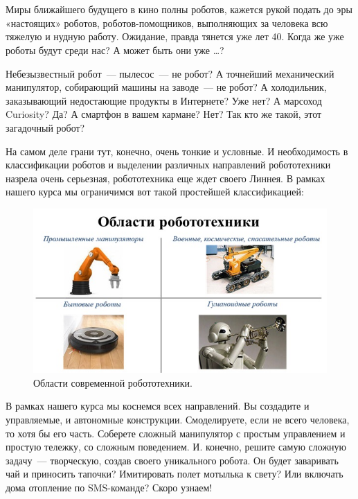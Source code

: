 {\hypertarget{lesson1x4}{}}\\\\

Миры ближайшего будущего в кино полны роботов, кажется рукой подать до  эры «настоящих» роботов, роботов-помощников, выполняющих за человека всю тяжелую и нудную работу. Ожидание, правда тянется уже лет 40. Когда же уже роботы будут среди нас? А может быть они уже \dots?

Небезызвестный робот~--- пылесос~--- не робот? А точнейший механический манипулятор, собирающий  машины на заводе~--- не робот? А холодильник, заказывающий недостающие продукты в Интернете? Уже нет?  А  марсоход  Curiosity? Да? А смартфон в вашем кармане? Нет?  Так кто же такой, этот загадочный робот?

На самом деле грани тут, конечно, очень тонкие и условные. И необходимость в классификации роботов и выделении различных направлений робототехники назрела очень серьезная, робототехника еще ждет своего Линнея. В рамках нашего курса мы ограничимся вот такой простейшей классификацией:
\clearpage
\begin{figure}[h!]
	\begin{center}
		\includegraphics[width=1\linewidth]{chapters/chapter1/images/10}
		\caption{Области современной робототехники.}
		\label{ris:image1x10}
	\end{center}
\end{figure}		

В рамках нашего курса мы коснемся всех направлений. Вы создадите и управляемые, и автономные конструкции. Смоделируете, если не всего человека, то хотя бы его часть. Соберете сложный манипулятор с простым управлением и простую тележку, со сложным поведением. И. конечно, решите самую сложную задачу~--- творческую, создав своего уникального робота. Он будет заваривать чай и приносить тапочки? Имитировать полет мотылька к свету? Или включать дома отопление по SMS-команде? Скоро узнаем!\\\\


